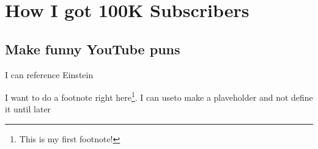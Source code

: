 \chapter{How I got 100K Subscribers}

\section{Make funny YouTube puns}

I can reference Einstein\cite{einstein}

I want to do a footnote right here\footnote{This is my first footnote!}. I can use\footnotemark to make a plaveholder and not define it until later\footnotemark[\value{footnote}]


\lipsum[1-10]